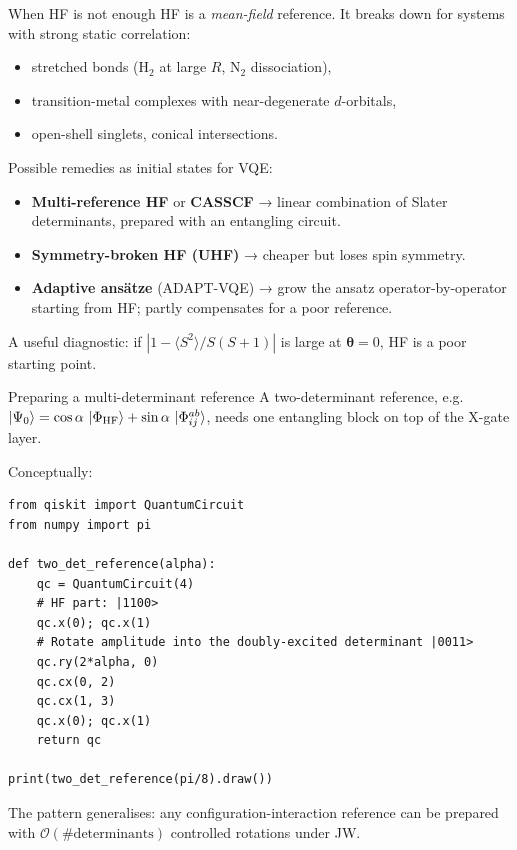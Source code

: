 \documentclass[10pt,aspectratio=169]{beamer}
\begin{document}
\begin{frame}{When HF is not enough}
HF is a \emph{mean-field} reference. It breaks down for systems with strong static correlation:
\begin{itemize}
  \item stretched bonds (H$_2$ at large $R$, N$_2$ dissociation),
  \item transition-metal complexes with near-degenerate $d$-orbitals,
  \item open-shell singlets, conical intersections.
\end{itemize}

\smallskip
Possible remedies as initial states for VQE:
\begin{itemize}
  \item \textbf{Multi-reference HF} or \textbf{CASSCF} → linear combination of Slater determinants, prepared with an entangling circuit.
  \item \textbf{Symmetry-broken HF (UHF)} → cheaper but loses spin symmetry.
  \item \textbf{Adaptive ansätze} (ADAPT-VQE) → grow the ansatz operator-by-operator starting from HF; partly compensates for a poor reference.
\end{itemize}

A useful diagnostic: if $|1 - \langle S^2\rangle / S(S+1)|$ is large at $\bm\theta = 0$, HF is a poor starting point.
\end{frame}

\begin{frame}[fragile]{Preparing a multi-determinant reference}
A two-determinant reference, e.g.\
\(\ket{\Psi_0} = \cos\alpha\,\ket{\Phi_{\text{HF}}} + \sin\alpha\,\ket{\Phi^{ab}_{ij}}\),
needs one entangling block on top of the X-gate layer.

\smallskip
Conceptually:
\begin{lstlisting}
from qiskit import QuantumCircuit
from numpy import pi

def two_det_reference(alpha):
    qc = QuantumCircuit(4)
    # HF part: |1100>
    qc.x(0); qc.x(1)
    # Rotate amplitude into the doubly-excited determinant |0011>
    qc.ry(2*alpha, 0)
    qc.cx(0, 2)
    qc.cx(1, 3)
    qc.x(0); qc.x(1)
    return qc

print(two_det_reference(pi/8).draw())
\end{lstlisting}

\smallskip
The pattern generalises: any configuration-interaction reference can be prepared with $\mathcal{O}(\text{\# determinants})$ controlled rotations under JW.
\end{frame}
\end{document}
